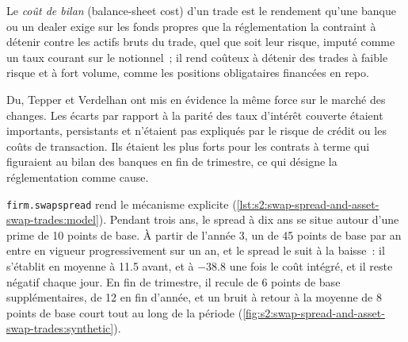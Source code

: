 \begin{definition}\label{def:s2:swap-spread-and-asset-swap-trades:bscost}
Le \emph{coût de bilan} (balance-sheet cost) d'un trade est le rendement qu'une banque ou un dealer exige sur les fonds propres que la réglementation la contraint à détenir
contre les actifs bruts du trade, quel que soit leur risque, imputé comme un taux courant sur le notionnel~; il rend coûteux à détenir des trades à faible risque et à fort volume, comme
les positions obligataires financées en repo.
\end{definition}

Du, Tepper et Verdelhan ont mis en évidence la même force sur le marché des changes. Les écarts par rapport à la parité des taux d'intérêt couverte étaient importants, persistants et n'étaient pas expliqués par
le risque de crédit ou les coûts de transaction. Ils étaient les plus forts pour les contrats à terme qui figuraient au bilan des banques en fin de trimestre, ce qui désigne
la réglementation comme cause.

\texttt{firm.swapspread} rend le mécanisme explicite (\cref{lst:s2:swap-spread-and-asset-swap-trades:model}). Pendant trois ans, le spread à dix ans
se situe autour d'une prime de 10 points de base. À partir de l'année 3, un  de 45 points de base par an entre en vigueur progressivement sur un an, et le spread le suit
à la baisse~: il s'établit en moyenne à 11.5 avant, et à $-38.8$ une fois le coût intégré, et il reste négatif chaque jour. En fin de trimestre, il recule de 6 points de base supplémentaires,
de 12 en fin d'année, et un bruit à retour à la moyenne de 8 points de base court tout au long de la période (\cref{fig:s2:swap-spread-and-asset-swap-trades:synthetic}).

\begin{omfigure}

\label{fig:s2:swap-spread-and-asset-swap-trades:synthetic}
\end{omfigure}

